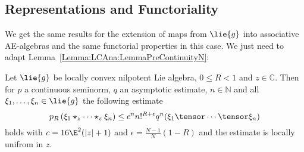%
%

\subsection{Representations and Functoriality}
\label{subsec:NilpotentFunctorialityRepresentations}

We get the same results for the extension of maps from $\lie{g}$ into 
associative AE-algebras and the same functorial properties in this case.
We just need to adapt Lemma~\ref{Lemma:LCAna:LemmaPreContinuityN}:
\begin{lemma}
    \label{Lemma:Nilpot:LemmaPreContinuityN}%
    Let $\lie{g}$ be locally convex nilpotent Lie algebra, $0 \leq R < 1$ and 
    $z \in \mathbb{C}$. Then for $p$ a continuous seminorm, $q$ an
    asymptotic estimate, $n \in \mathbb{N}$ and all $\xi_1, \ldots,
    \xi_n \in \lie{g}$ the following estimate
    \begin{equation}
        \label{Nilpot:LemmaPreContinuityN}
        p_R \left(
            \xi_1 \star_z \cdots \star_z \xi_n
        \right)
        \leq
        c^n n!^{R + \epsilon}
        q^n(\xi_1 \tensor \cdots \tensor \xi_n)
    \end{equation}
    holds with $c = 16 \E^2 (|z| + 1)$ and $\epsilon = \frac{N-1}{N}(1 - R)$
    and the estimate is locally unifrom in $z$.
\end{lemma}
